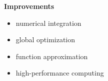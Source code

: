 \begin{frame}

\textbf{Improvements}\vspace{0.5cm}
\begin{itemize}\setlength\itemsep{1em}
\item numerical integration
\item global optimization
\item function approximation
\item high-performance computing
\end{itemize}
\end{frame}
